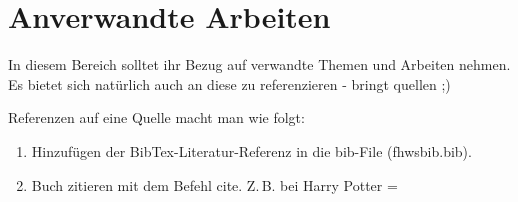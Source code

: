 \section{Anverwandte Arbeiten}\label{sec:relatedWork}
In diesem Bereich solltet ihr Bezug auf verwandte Themen und Arbeiten nehmen.
Es bietet sich natürlich auch an diese zu referenzieren - bringt quellen ;)

Referenzen auf eine Quelle macht man wie folgt:
\begin{enumerate}
	\item Hinzufügen der BibTex-Literatur-Referenz in die bib-File (fhwsbib.bib). 
	\item Buch zitieren mit dem Befehl cite. Z.\,B. bei Harry Potter = \cite{Rowling2015}
\end{enumerate}

